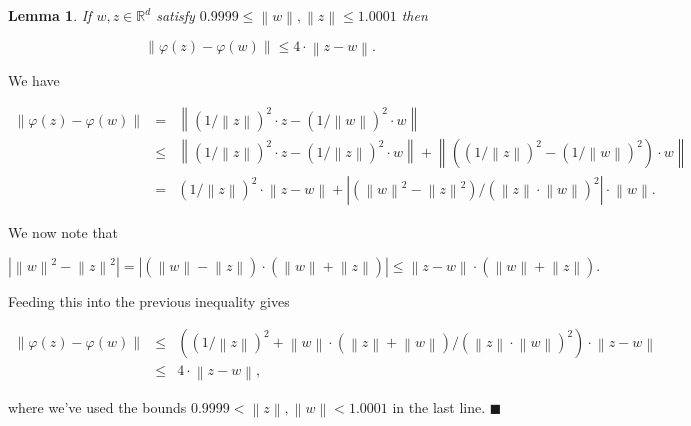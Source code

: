 \documentclass[11pt]{article}%
\newenvironment{proof}{\vspace{1ex}\noindent{\bf Proof.}}{\hspace*{\fill}$\blacksquare$\vspace{1ex}}
\newtheorem{lemma}[lemma]{Lemma}
\newcommand{\eR}[0]{\ensuremath{ \mathbb R}}
\newcommand{\norm}[1]{\ensuremath{\left\|#1\right\|}}
\begin{document}
\begin{lemma}\label{lem:phizw} 
If $w, z \in \eR^d$ satisfy $0.9999 \leq \norm{w},\norm{z} \leq 1.0001$ then 

$$ \norm{\varphi(z)-\varphi(w)} \leq 4 \cdot \norm{z-w}. $$

\end{lemma}

\begin{proof}
We have

$$ \begin{array}{rcl}
\norm{\varphi(z)-\varphi(w)} 
& = & 
\norm{(1/\norm{z})^2\cdot z- (1/\norm{w})^2 \cdot w} \\[2ex]
& \leq & 
\norm{(1/\norm{z})^2\cdot z- (1/\norm{z})^2 \cdot w}
+ \norm{\left((1/\norm{z})^2- (1/\norm{w})^2\right) \cdot w} \\[2ex]
& = & 
(1/\norm{z})^2 \cdot \norm{z- w} 
+ \left|(\norm{w}^2-\norm{z}^2)/(\norm{z}\cdot\norm{w})^2\right| \cdot \norm{w}.
\end{array} $$

\noindent
We now note that 

$$ \left|\norm{w}^2-\norm{z}^2\right| = \left|(\norm{w}-\norm{z})\cdot(\norm{w}+\norm{z})\right|
\leq \norm{z-w} \cdot (\norm{w}+\norm{z}). $$

\noindent
Feeding this into the previous inequality gives

$$ \begin{array}{rcl}
\norm{\varphi(z)-\varphi(w)} 
& \leq & 
\left((1/\norm{z})^2 + \norm{w}\cdot (\norm{z}+\norm{w})/(\norm{z}\cdot\norm{w})^2 \right) \cdot \norm{z-w}  \\
& \leq & 
4 \cdot \norm{z-w},
\end{array} $$

\noindent 
where we've used the bounds $0.9999 < \norm{z},\norm{w} < 1.0001$ in the last line.
\end{proof}
\end{document}
